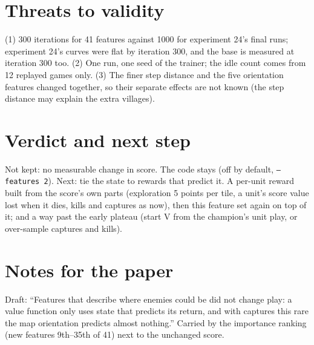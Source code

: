 \documentclass{../polyexp}
\begin{document}
\section{Threats to validity}
(1) 300 iterations for 41 features against 1000 for experiment 24's final runs; experiment 24's curves were flat
by iteration 300, and the base is measured at iteration 300 too. (2) One run, one seed of the trainer; the idle count
comes from 12 replayed games only. (3) The finer step distance and the five orientation features changed together,
so their separate effects are not known (the step distance may explain the extra villages).

\section{Verdict and next step}
Not kept: no measurable change in score. The code stays (off by default, \texttt{--features 2}). Next: tie the state
to rewards that predict it. A per-unit reward built from the score's own parts (exploration 5 points per tile,
a unit's score value lost when it dies, kills and captures as now), then this feature set again on top of it; and a
way past the early plateau (start V from the champion's unit play, or over-sample captures and kills).

\section{Notes for the paper}
Draft: ``Features that describe where enemies could be did not change play: a value function only uses state
that predicts its return, and with captures this rare the map orientation predicts almost nothing.'' Carried by the
importance ranking (new features 9th--35th of 41) next to the unchanged score.
\end{document}
